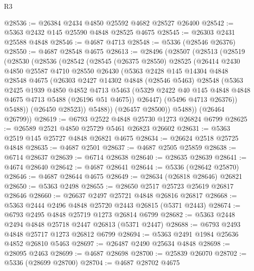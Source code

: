 \begin{lexlean}{R3}
\begin{coremodule}
@28536 := @26384 @2434 @4850 @25592 @4682 @28527 @26400
@28542 := @5363 @2432 @145 @25590 @4848 @28525 @4675
@28545 := @26303 @2431 @25588 @4848
@28546 := @4687 @4713
@28548 := @5336 (@28546 @26376)
@28550 := @4687 @28548 @4675
@28613 := @28496
    (@28507
      (@28513
        (@28519
          (@28530
            (@28536
              (@28542
                (@28545
                  (@26375 @28550)
                  @28525
                  (@26414
                    @2430
                    @4850
                    @25587
                    @4710
                    @28550
                    @26430
                    (@5363
                      @2428
                      @145
                      @14304
                      @4848
                      @28548
                      @4675
                      (@26303
                        @2427
                        @14302
                        @4848
                        (@28546 @5463)
                        @28548
                        (@5363
                          @2425
                          @1939
                          @4850
                          @4852
                          @4713
                          @5463
                          (@5329 @2422 @40 @145 @4848 @4848 @4675 @4713 @5488 (@26196 @51 @4675))
                          @26447)
                        (@5496 @4713 @26376))
                      @5488))
                  (@26450 @28523))
                @5488))
            (@26457 @28500))
          @5488))
      (@26464 @26799))
@28619 := @6793 @2522 @4848 @25730 @1273 @26824 @6799
@28625 := @26589 @2521 @4850 @25729 @5461 @26823 @26602
@28631 := @5363 @2519 @145 @25727 @4848 @26821 @4675
@28634 := @26624 @2518 @25725 @4848
@28635 := @4687 @2501
@28637 := @4687 @2505 @25859
@28638 := @6714 @28637
@28639 := @6714 @28638
@28640 := @28635 @28639
@28641 := @4674 @28640
@28642 := @4687 @28641
@28644 := @5336 (@28642 @25870)
@28646 := @4687 @28644 @4675
@28649 := @28634 (@26818 @28646) @26821
@28650 := @5363 @2498
@28655 := @28650 @2517 @25723 @25619 @26817 @28646
@28660 := @26637 @2497 @25721 @4848 @26816 @26817
@28668 := @5363 @2444 @2496 @4848 @25720 @2443 @26815 (@5371 @2443)
@28674 := @6793 @2495 @4848 @25719 @1273 @26814 @6799
@28682 := @5363 @2448 @2494 @4848 @25718 @2447 @26813 (@5371 @2447)
@28688 := @6793 @2493 @4848 @25717 @1273 @26812 @6799
@28694 := @5363 @2491 @1984 @25636 @4852 @26810 @5463
@28697 := @26487 @2490 @25634 @4848
@28698 := @28095 @2463
@28699 := @4687 @28698
@28700 := @25839 @26070
@28702 := @5336 (@28699 @28700)
@28704 := @4687 @28702 @4675

\end{coremodule}
\end{lexlean}

